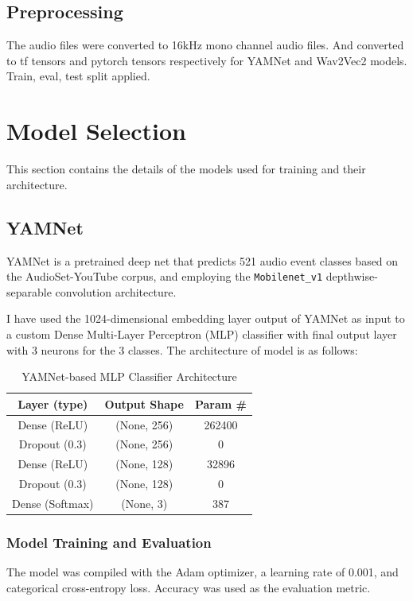 \documentclass[conference]{IEEEtran}
\begin{document}
\subsection{Preprocessing}
The audio files were converted to 16kHz mono channel audio files. And converted to tf tensors and pytorch tensors respectively for YAMNet and Wav2Vec2 models.
Train, eval, test split applied.


\section{Model Selection}
This section contains the details of the models used for training and their architecture.

\subsection{YAMNet}
YAMNet\cite{yamnet} is a pretrained deep net that predicts 521 audio event classes based on the AudioSet-YouTube corpus, and employing the \texttt{Mobilenet\_v1} depthwise-separable convolution architecture.

I have used the 1024-dimensional embedding layer output of YAMNet as input to a custom Dense Multi-Layer Perceptron (MLP) classifier with final output layer with 3 neurons for the 3 classes. The architecture of model is as follows:
\begin{table}[htbp]
\caption{YAMNet-based MLP Classifier Architecture}
\begin{center}
\begin{tabular}{|c|c|c|}
\hline
\textbf{Layer (type)} & \textbf{Output Shape} & \textbf{Param \#} \\
\hline
Dense (ReLU) & (None, 256) & 262400 \\
\hline
Dropout (0.3) & (None, 256) & 0 \\
\hline
Dense (ReLU) & (None, 128) & 32896 \\
\hline
Dropout (0.3) & (None, 128) & 0 \\
\hline
Dense (Softmax) & (None, 3) & 387 \\
\hline
\end{tabular}
\label{tab:yamnet_mlp}
\end{center}
\end{table}

\subsubsection*{Model Training and Evaluation}
The model was compiled with the Adam optimizer, a learning rate of 0.001, and categorical cross-entropy loss. Accuracy was used as the evaluation metric.
\end{document}
